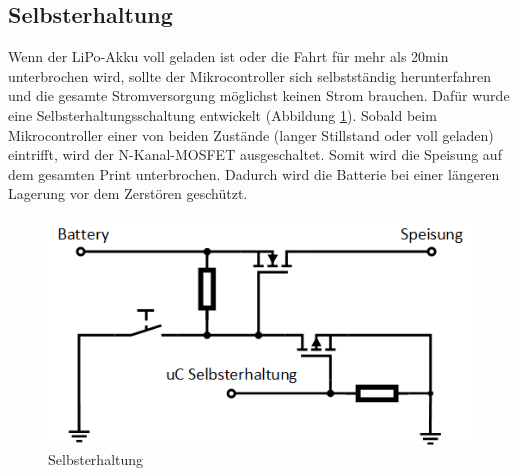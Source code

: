 \subsection*{Selbsterhaltung}
Wenn der LiPo-Akku voll geladen ist oder die Fahrt für mehr als 20min unterbrochen wird, sollte der Mikrocontroller sich selbstständig herunterfahren und die gesamte Stromversorgung möglichst keinen Strom brauchen. Dafür wurde eine Selbsterhaltungsschaltung entwickelt (Abbildung \ref{fig:Selbsterhaltung}). Sobald beim Mikrocontroller einer von beiden Zustände (langer Stillstand oder voll geladen) eintrifft, wird der N-Kanal-MOSFET ausgeschaltet. Somit wird die Speisung auf dem gesamten Print unterbrochen. Dadurch wird die Batterie bei einer längeren Lagerung vor dem Zerstören geschützt.

\begin{figure} [H]
	\centering
	\includegraphics[width=0.6\linewidth]{images/Selbsterhaltung}
	\caption{Selbsterhaltung}
	\label{fig:Selbsterhaltung}
\end{figure}




